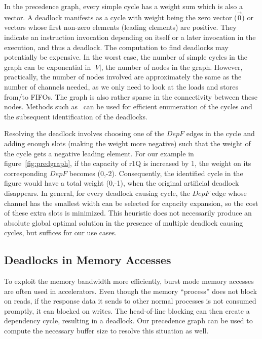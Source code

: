 \documentclass{sig-alternate}
\begin{document}
In the precedence graph, every simple cycle has a weight sum which is also a vector. A deadlock manifests as a cycle with weight being the zero vector ($\vec{0}$) or vectors whose first non-zero elements (leading elements) are positive.
They indicate an instruction invocation depending on itself or a later invocation in the execution, and thus a deadlock. 
The computation to find deadlocks may potentially be expensive. In the worst case, the number of simple cycles in the graph can be exponential in
$|V|$, the number of nodes in the graph. However, practically, the number of
nodes involved are approximately the same as the number of channels needed, as
we only need to look at the loads and stores from/to FIFOs.
The graph is also rather sparse in the connectivity between these nodes.  
Methods such as~\cite{doi:10.1137/0204007} can be used for efficient
enumeration of the cycles and the subsequent identification of the deadlocks.

Resolving
the deadlock involves choosing one of the $DepF$ edges
in the cycle and adding enough slots (making the weight more negative)
such that the weight of the cycle gets a negative leading element. For our example in figure~\ref{fig:predgraph}, if the capacity of r1Q
is increased by 1, the weight on its corresponding $DepF$ becomes (0,-2). Consequently, the identified cycle in the figure would have
a total weight (0,-1), when the original artificial deadlock disappears.
In general, for every deadlock causing cycle, the $DepF$ edge whose channel has the smallest width can be selected for capacity expansion, so the cost of these extra slots is minimized. This heuristic does not necessarily produce an absolute
global optimal solution in the presence of multiple deadlock causing cycles, but suffices for our use cases.








\subsection{Deadlocks in Memory Accesses}
To exploit the memory bandwidth more efficiently, burst mode memory accesses are often used in accelerators. Even though the memory ``process'' does not block on reads, if the response data it sends to other normal processes is not consumed promptly, it can blocked on writes. 
The head-of-line blocking can then create a dependency cycle, resulting in a deadlock. Our precedence graph can be used to compute the necessary buffer size to resolve this situation as well.
\end{document}
